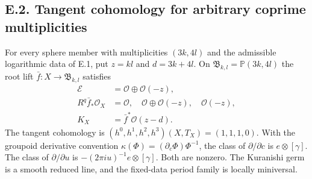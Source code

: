 \subsection{E.2. Tangent cohomology for arbitrary coprime multiplicities}
\begin{theorem}
For every sphere member with multiplicities $(3k,4l)$ and the
admissible logarithmic data of E.1, put $z=kl$ and $d=3k+4l$.
On $\mathfrak B_{k,l}=\mathbb P(3k,4l)$ the root lift
$\bar f:X\to\mathfrak B_{k,l}$ satisfies
\[
 \begin{split}
 \mathcal E&=\mathcal O\oplus\mathcal O(-z),\\
 R^q\bar f_*\mathcal O_X&=
 \mathcal O,\quad\mathcal O\oplus\mathcal O(-z),\quad\mathcal O(-z),\\
 K_X&=\bar f^*\mathcal O(z-d).
 \end{split}
\]
The tangent cohomology is $(h^0,h^1,h^2,h^3)(X,T_X)=(1,1,1,0)$.
With the groupoid derivative convention
$\kappa(\Phi)=(\partial_c\Phi)\Phi^{-1}$, the class of
$\partial/\partial c$ is $e\otimes[\gamma]$.  The class of
$\partial/\partial u$ is
$-(2\pi i u)^{-1}e\otimes[\gamma]$.  Both are nonzero.
The Kuranishi germ is a smooth reduced line, and the fixed-data
period family is locally miniversal.
\end{theorem}
